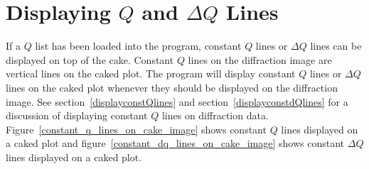 \section{\texorpdfstring{Displaying $Q$ and $\Delta Q$ Lines}
    {Displaying Q and delta Q Lines}}
    \label{cakeQlinesandpeaks}

If a $Q$ list has been loaded into the program, 
constant $Q$ lines or $\Delta Q$ lines can be 
displayed on top of the cake. 
Constant $Q$ lines on the diffraction image are 
vertical lines on the caked plot. 
The program will display constant $Q$ lines or 
$\Delta Q$ lines on the caked plot whenever they 
should be displayed on the diffraction image. See 
section~\ref{displayconstQlines} and 
section~\ref{displayconstdQlines} for a discussion of 
displaying constant $Q$ lines on diffraction data.
Figure~\ref{constant_q_lines_on_cake_image} shows constant
$Q$ lines displayed on a caked plot and 
figure~\ref{constant_dq_lines_on_cake_image} shows constant
$\Delta Q$ lines displayed on a caked plot.


